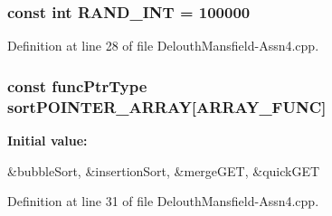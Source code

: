 \hypertarget{_delouth_mansfield-_assn4_8cpp_a134c2ba56ae9ba89c77a5c0dba9f2124}{
\subsubsection[{RAND\_\-INT}]{\setlength{\rightskip}{0pt plus 5cm}const int {\bf RAND\_\-INT} = 100000}}
\label{_delouth_mansfield-_assn4_8cpp_a134c2ba56ae9ba89c77a5c0dba9f2124}


Definition at line 28 of file DelouthMansfield-\/Assn4.cpp.

\hypertarget{_delouth_mansfield-_assn4_8cpp_ae039780346621e190c7726c08c9a1a13}{
\subsubsection[{sortPOINTER\_\-ARRAY}]{\setlength{\rightskip}{0pt plus 5cm}const {\bf funcPtrType} {\bf sortPOINTER\_\-ARRAY}\mbox{[}{\bf ARRAY\_\-FUNC}\mbox{]}}}
\label{_delouth_mansfield-_assn4_8cpp_ae039780346621e190c7726c08c9a1a13}
{\bfseries Initial value:}
\begin{DoxyCode}
 {&bubbleSort,
                                          &insertionSort,
                                          &mergeGET,
                                                   &quickGET}
\end{DoxyCode}


Definition at line 31 of file DelouthMansfield-\/Assn4.cpp.

